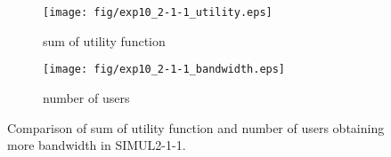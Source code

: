 \begin{figure}
	\begin{center}
		\begin{subfigure}[b]{0.8\textwidth}
			\centering
			\texttt{[image: fig/exp10\_2-1-1\_utility.eps]}
			\caption{sum of utility function}
			\label{figure:simul2_1_1_u_a}
		\end{subfigure}
		\begin{subfigure}[b]{0.8\textwidth}
			\centering
			\texttt{[image: fig/exp10\_2-1-1\_bandwidth.eps]}
			\caption{number of users}
			\label{figure:simul2_1_1_u_b}
		\end{subfigure}
		\caption{Comparison of sum of utility function and number of users obtaining more bandwidth in SIMUL2-1-1.}
		\label{figure:simul2_1_1_u}
	\end{center}
\end{figure}

\clearpage

